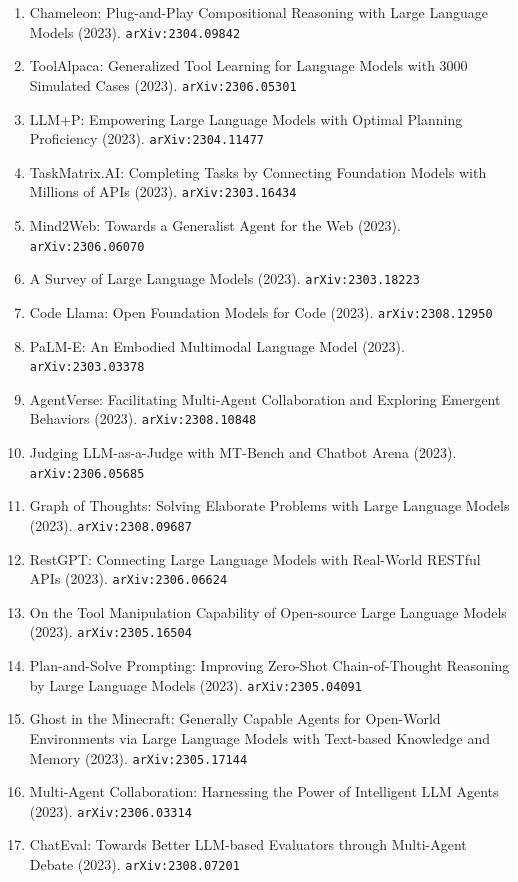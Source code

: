 \documentclass[11pt]{article}
\begin{document}
\begin{enumerate}
  Tool Embeddings (2023). \texttt{arXiv:2305.11554}
  \item Chameleon: Plug-and-Play Compositional Reasoning with Large Language
  Models (2023). \texttt{arXiv:2304.09842}
  \item ToolAlpaca: Generalized Tool Learning for Language Models with 3000
  Simulated Cases (2023). \texttt{arXiv:2306.05301}
  \item LLM+P: Empowering Large Language Models with Optimal Planning
  Proficiency (2023). \texttt{arXiv:2304.11477}
  \item TaskMatrix.AI: Completing Tasks by Connecting Foundation Models with
  Millions of APIs (2023). \texttt{arXiv:2303.16434}
  \item Mind2Web: Towards a Generalist Agent for the Web (2023). \texttt{arXiv:2306.06070}
  \item A Survey of Large Language Models (2023). \texttt{arXiv:2303.18223}
  \item Code Llama: Open Foundation Models for Code (2023). \texttt{arXiv:2308.12950}
  \item PaLM-E: An Embodied Multimodal Language Model (2023). \texttt{arXiv:2303.03378}
  \item AgentVerse: Facilitating Multi-Agent Collaboration and Exploring
  Emergent Behaviors (2023). \texttt{arXiv:2308.10848}
  \item Judging LLM-as-a-Judge with MT-Bench and Chatbot Arena (2023). \texttt{arXiv:2306.05685}
  \item Graph of Thoughts: Solving Elaborate Problems with Large Language Models (2023). \texttt{arXiv:2308.09687}
  \item RestGPT: Connecting Large Language Models with Real-World RESTful APIs (2023). \texttt{arXiv:2306.06624}
  \item On the Tool Manipulation Capability of Open-source Large Language Models (2023). \texttt{arXiv:2305.16504}
  \item Plan-and-Solve Prompting: Improving Zero-Shot Chain-of-Thought Reasoning
  by Large Language Models (2023). \texttt{arXiv:2305.04091}
  \item Ghost in the Minecraft: Generally Capable Agents for Open-World
  Environments via Large Language Models with Text-based Knowledge and Memory (2023). \texttt{arXiv:2305.17144}
  \item Multi-Agent Collaboration: Harnessing the Power of Intelligent LLM
  Agents (2023). \texttt{arXiv:2306.03314}
  \item ChatEval: Towards Better LLM-based Evaluators through Multi-Agent Debate (2023). \texttt{arXiv:2308.07201}

\end{enumerate}
\end{document}
